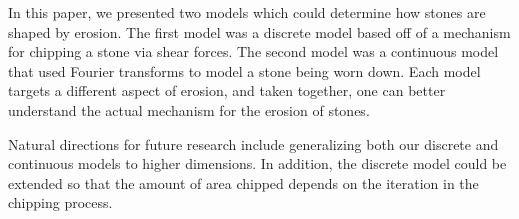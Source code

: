 In this paper, we presented two models which could determine how stones are shaped by erosion. The first model was a discrete model based off of a mechanism for chipping a stone via shear forces. The second model was a continuous model that used Fourier transforms to model a stone being worn down. Each model targets a different aspect of erosion, and taken together, one can better understand the actual mechanism for the erosion of stones.

Natural directions for future research include generalizing both our discrete and continuous models to higher dimensions. In addition, the discrete model could be extended so that the amount of area chipped depends on the iteration in the chipping process. 
